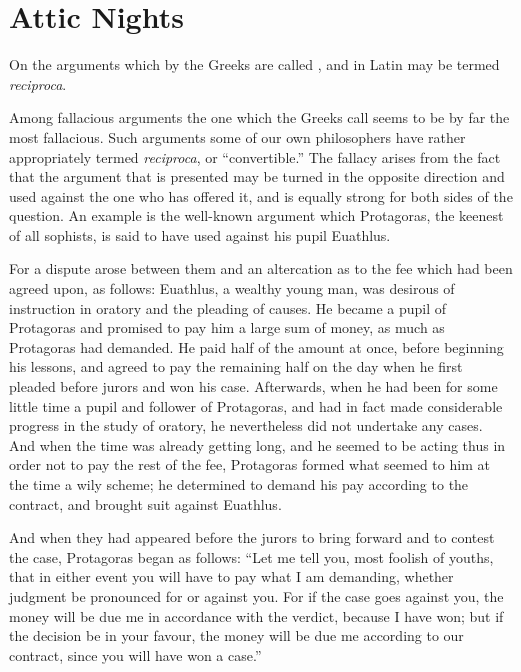 
\author{Aulus Gellius}
\chapter[Attic Nights, bk. 5.10]{Attic Nights}

\begin{center}{\small On the arguments which by the Greeks
are called , and in Latin may be termed
\textit{reciproca}.}\end{center}

\noindent Among fallacious arguments the one which the Greeks call
 seems to be by far the most fallacious. Such
arguments some of our own philosophers have rather appropriately
termed \textit{reciproca}, or ``convertible.'' The fallacy arises from
the fact that the argument that is presented may be turned in the
opposite direction and used against the one who has offered it, and is
equally strong for both sides of the question. An example is the
well-known argument which Protagoras, the keenest of all sophists, is
said to have used against his pupil Euathlus.

 For a dispute arose between them and an altercation as to
the fee which had been agreed upon, as follows: Euathlus, a wealthy
young man, was desirous of instruction in oratory and the pleading of
causes. He became a pupil of Protagoras and promised to pay him a
large sum of money, as much as Protagoras had demanded. He paid half
of the amount at once, before beginning his lessons, and agreed to pay
the remaining half on the day when he first pleaded before jurors and
won his case. Afterwards, when he had been for some little time a
pupil and follower of Protagoras, and had in fact made considerable
progress in the study of oratory, he nevertheless did not undertake
any cases. And when the time was already getting long, and he seemed
to be acting thus in order not to pay the rest of the fee, Protagoras
formed what seemed to him at the time a wily scheme; he determined to
demand his pay according to the contract, and brought suit against
Euathlus.

And when they had appeared before the jurors to bring forward and to
contest the case, Protagoras began as follows: ``Let me tell you, most
foolish of youths, that in either event you will have to pay what I am
demanding, whether judgment be pronounced for or against you. For if
the case goes against you, the money will be due me in accordance with
the verdict, because I have won; but if the decision be in your
favour, the money will be due me according to our contract, since you
will have won a case.''

